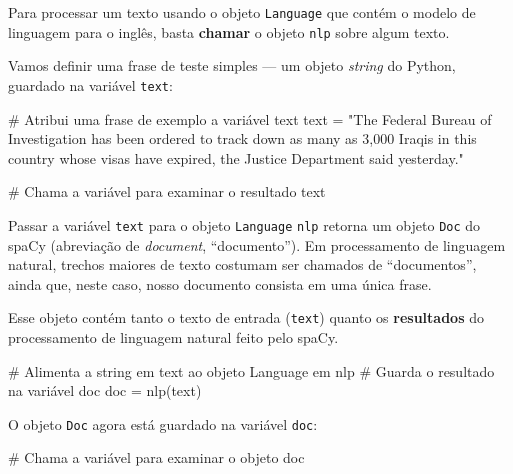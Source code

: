 \documentclass[
  brazilian,
  11pt,
]{article}
\newenvironment{Shaded}{\begin{snugshade}}{\end{snugshade}}
\newcommand{\CommentTok}[1]{\textcolor[rgb]{0.48,0.49,0.49}{#1}}
\newcommand{\NormalTok}[1]{\textcolor[rgb]{0.81,0.81,0.76}{#1}}
\newcommand{\OperatorTok}[1]{\textcolor[rgb]{0.81,0.81,0.76}{#1}}
\newcommand{\StringTok}[1]{\textcolor[rgb]{0.96,0.31,0.31}{#1}}
\let\oldtexttt\texttt
\renewcommand{\texttt}[1]{{\color{inlink}\oldtexttt{#1}}}
\begin{document}
Para processar um texto usando o objeto \texttt{Language} que contém o
modelo de linguagem para o inglês, basta \textbf{chamar} o objeto
\texttt{nlp} sobre algum texto.

Vamos definir uma frase de teste simples --- um objeto \emph{string} do
Python, guardado na variável \texttt{text}:

\begin{Shaded}
\begin{Highlighting}[]
\CommentTok{\# Atribui uma frase de exemplo a variável \textquotesingle{}text\textquotesingle{}}
\NormalTok{text }\OperatorTok{=} \StringTok{"The Federal Bureau of Investigation has been ordered to track down as many as 3,000 Iraqis in this country whose visas have expired, the Justice Department said yesterday."}

\CommentTok{\# Chama a variável para examinar o resultado}
\NormalTok{text}
\end{Highlighting}
\end{Shaded}

Passar a variável \texttt{text} para o objeto \texttt{Language}
\texttt{nlp} retorna um objeto \texttt{Doc} do spaCy (abreviação de
\emph{document}, ``documento''). Em processamento de linguagem natural,
trechos maiores de texto costumam ser chamados de ``documentos'', ainda
que, neste caso, nosso documento consista em uma única frase.

Esse objeto contém tanto o texto de entrada (\texttt{text}) quanto os
\textbf{resultados} do processamento de linguagem natural feito pelo
spaCy.

\begin{Shaded}
\begin{Highlighting}[]
\CommentTok{\# Alimenta a string em \textquotesingle{}text\textquotesingle{} ao objeto Language em \textquotesingle{}nlp\textquotesingle{}}
\CommentTok{\# Guarda o resultado na variável \textquotesingle{}doc\textquotesingle{}}
\NormalTok{doc }\OperatorTok{=}\NormalTok{ nlp(text)}
\end{Highlighting}
\end{Shaded}

O objeto \texttt{Doc} agora está guardado na variável \texttt{doc}:

\begin{Shaded}
\begin{Highlighting}[]
\CommentTok{\# Chama a variável para examinar o objeto}
\NormalTok{doc}
\end{Highlighting}
\end{Shaded}
\end{document}

